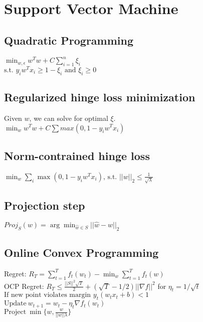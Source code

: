 \section{Support Vector Machine}
\subsection*{Quadratic Programming}
$\min_{w,\epsilon} w^Tw + C \sum_{i=1}^n \xi_i$\\
$\text{s.t. } y_i w^T x_i \geq 1 - \xi_i \text{ and } \xi_i\geq0$

\subsection*{Regularized hinge loss minimization}
Given $w$, we can solve for optimal $\xi$.\\
$\min_w w^T w + C \sum max(0, 1- y_i w^T x_i)$

\subsection*{Norm-contrained hinge loss}
$\min_w \sum_i \max(0,1-y_i w^T x_i) \text{, s.t. } ||w||_2\leq \frac{1}{\sqrt{\lambda}}$

\subsection*{Projection step}
$Proj_S(w) = \arg \min_{\hat{w} \in S} ||\hat{w} - w||_2$

\subsection*{Online Convex Programming} %
\label{ssub:online_convex_programming}
Regret: $ R_T = \sum_{t=1}^T f_t(w_t) - \min_w \sum_{t=1}^T f_t(w)$ \\
OCP Regret: $R_T \leq \frac{||S||^2\sqrt{T}}{2} + (\sqrt{T}-1/2) || \nabla f||^2$  for $\eta_t = 1 / \sqrt{t}$\\
$\textrm{If new point violates margin } y_t (w_t x_t + b) < 1$ \\ 
$\textrm{Update} \ w_{t+1} = w_t - \eta_t \nabla f_t(w_t)$ \\
$\textrm{Project}\ \min \{w,\frac{w}{||w|| \lambda} \}$

